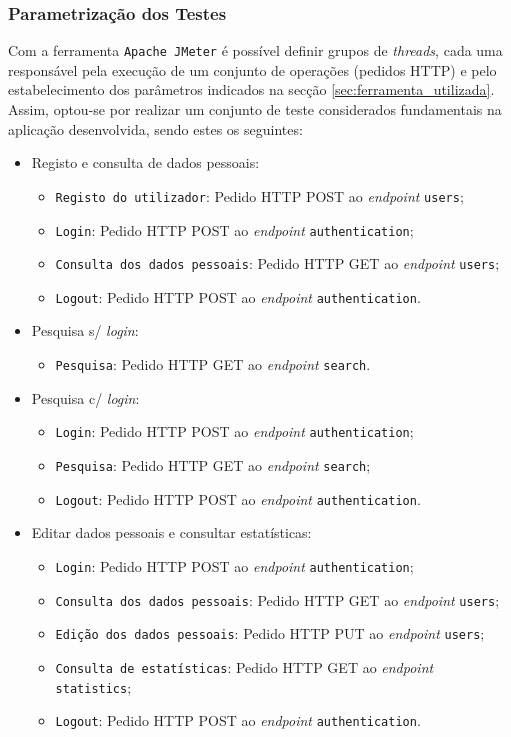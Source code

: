 \subsubsection{Parametrização dos Testes}
Com a ferramenta \texttt{Apache JMeter} é possível definir grupos de \textit{threads}, cada uma responsável pela execução de um conjunto de operações (pedidos HTTP) e pelo estabelecimento dos parâmetros indicados na secção \ref{sec:ferramenta_utilizada}. Assim, optou-se por realizar um conjunto de teste considerados fundamentais na aplicação desenvolvida, sendo estes os seguintes: 
\begin{itemize}
    \item Registo e consulta de dados pessoais:
    \begin{itemize}
        \item \texttt{Registo do utilizador}: Pedido HTTP POST ao \textit{endpoint} \texttt{users};
        \item \texttt{Login}: Pedido HTTP POST ao \textit{endpoint} \texttt{authentication};
        \item \texttt{Consulta dos dados pessoais}: Pedido HTTP GET ao \textit{endpoint} \texttt{users};
        \item \texttt{Logout}: Pedido HTTP POST ao \textit{endpoint} \texttt{authentication}.
    \end{itemize}
    \item Pesquisa s/ \textit{login}:
    \begin{itemize}
        \item \texttt{Pesquisa}: Pedido HTTP GET ao \textit{endpoint} \texttt{search}.
    \end{itemize}
    \item Pesquisa c/ \textit{login}:
    \begin{itemize}
        \item \texttt{Login}: Pedido HTTP POST ao \textit{endpoint} \texttt{authentication};
        \item \texttt{Pesquisa}: Pedido HTTP GET ao \textit{endpoint} \texttt{search};
        \item \texttt{Logout}: Pedido HTTP POST ao \textit{endpoint} \texttt{authentication}.
    \end{itemize}
    \item Editar dados pessoais e consultar estatísticas:
    \begin{itemize}
        \item \texttt{Login}: Pedido HTTP POST ao \textit{endpoint} \texttt{authentication};
        \item \texttt{Consulta dos dados pessoais}: Pedido HTTP GET ao \textit{endpoint} \texttt{users};
        \item \texttt{Edição dos dados pessoais}: Pedido HTTP PUT ao \textit{endpoint} \texttt{users};
        \item \texttt{Consulta de estatísticas}: Pedido HTTP GET ao \textit{endpoint} \texttt{statistics};
        \item \texttt{Logout}: Pedido HTTP POST ao \textit{endpoint} \texttt{authentication}.
    \end{itemize}
\end{itemize}

